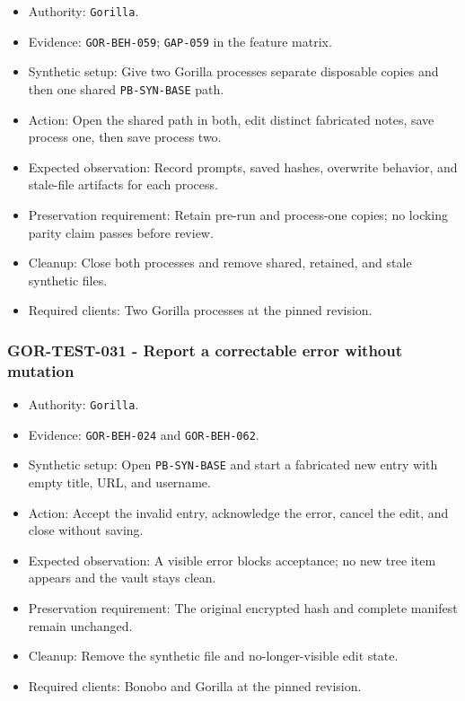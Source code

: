 \documentclass[
  letterpaper,
]{article}
\newcommand{\passthrough}[1]{#1}
\providecommand{\tightlist}{%
  \setlength{\itemsep}{0pt}\setlength{\parskip}{0pt}}
\begin{document}
\begin{itemize}
\tightlist
\item
  Authority: \passthrough{\lstinline!Gorilla!}.
\item
  Evidence: \nolinkurl{GOR-BEH-059}; \passthrough{\lstinline!GAP-059!} in the feature matrix.
\item
  Synthetic setup: Give two Gorilla processes separate disposable copies and then one shared \nolinkurl{PB-SYN-BASE}
  path.
\item
  Action: Open the shared path in both, edit distinct fabricated notes, save process one, then save process two.
\item
  Expected observation: Record prompts, saved hashes, overwrite behavior, and stale-file artifacts for each process.
\item
  Preservation requirement: Retain pre-run and process-one copies; no locking parity claim passes before review.
\item
  Cleanup: Close both processes and remove shared, retained, and stale synthetic files.
\item
  Required clients: Two Gorilla processes at the pinned revision.
\end{itemize}

\subsubsection{GOR-TEST-031 - Report a correctable error without
mutation}\label{gor-test-031---report-a-correctable-error-without-mutation}

\begin{itemize}
\tightlist
\item
  Authority: \passthrough{\lstinline!Gorilla!}.
\item
  Evidence: \nolinkurl{GOR-BEH-024} and \nolinkurl{GOR-BEH-062}.
\item
  Synthetic setup: Open \nolinkurl{PB-SYN-BASE} and start a fabricated new entry with empty title, URL, and username.
\item
  Action: Accept the invalid entry, acknowledge the error, cancel the edit, and close without saving.
\item
  Expected observation: A visible error blocks acceptance; no new tree item appears and the vault stays clean.
\item
  Preservation requirement: The original encrypted hash and complete manifest remain unchanged.
\item
  Cleanup: Remove the synthetic file and no-longer-visible edit state.
\item
  Required clients: Bonobo and Gorilla at the pinned revision.
\end{itemize}
\end{document}
